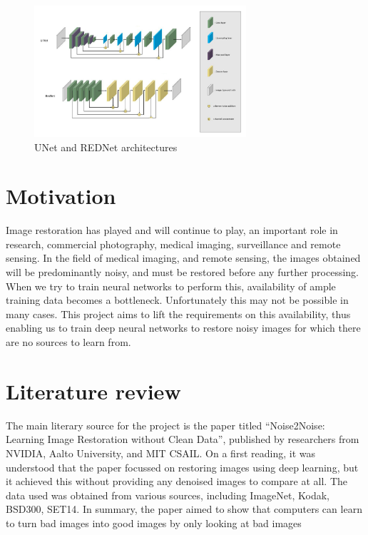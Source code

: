 \documentclass[journal]{IEEEtran} %
\begin{document}

\begin{figure}[htbp]
    \centering
    \includegraphics[width=0.7\textwidth]{model.png}
    \caption{UNet and REDNet architectures}
    \label{fig:architecture}
\end{figure}

\section{Motivation}
Image restoration has played and will continue to play, an important role in research, commercial photography, medical imaging, surveillance and remote sensing. In the field of medical imaging, and remote sensing, the images obtained will be predominantly noisy, and must be restored before any further processing. When we try to train neural networks to perform this, availability of ample training data becomes a bottleneck. Unfortunately this may not be possible in many cases. This project aims to lift the requirements on this availability, thus enabling us to train deep neural networks to restore noisy images for which there are no sources to learn from. 

\section{Literature review}
The main literary source for the project is the paper titled “Noise2Noise: Learning Image Restoration without Clean Data”, published by researchers from NVIDIA, Aalto University, and MIT CSAIL. On a first reading, it was understood that the paper focussed on restoring images using deep learning, but it achieved this without providing any denoised images to compare at all. The data used was obtained from various sources, including ImageNet, Kodak, BSD300, SET14. In summary, the paper aimed to show that computers can learn to turn bad images into good images by only looking at bad images
\end{document}
